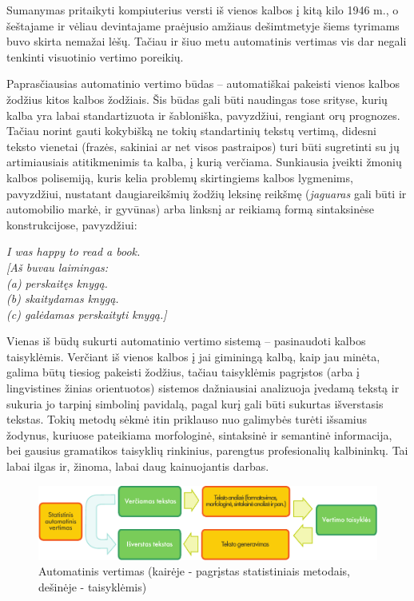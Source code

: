 \begin{multicols}{2}
 Sumanymas pritaikyti kompiuterius versti iš vienos kalbos į kitą kilo 1946 m., o šeštajame ir vėliau devintajame praėjusio amžiaus dešimtmetyje šiems tyrimams buvo skirta nemažai lėšų. Tačiau ir šiuo metu automatinis vertimas vis dar negali tenkinti visuotinio vertimo poreikių.


Paprasčiausias automatinio vertimo būdas – automatiškai pakeisti vienos kalbos žodžius kitos kalbos žodžiais. Šis būdas gali būti naudingas tose srityse, kurių kalba yra labai standartizuota ir šabloniška, pavyzdžiui, rengiant orų prognozes. Tačiau norint gauti kokybišką ne tokių standartinių tekstų vertimą, didesni teksto vienetai (frazės, sakiniai ar net visos pastraipos) turi būti sugretinti su jų artimiausiais atitikmenimis ta kalba, į kurią verčiama. Sunkiausia įveikti žmonių kalbos polisemiją, kuris kelia problemų skirtingiems kalbos lygmenims, pavyzdžiui, nustatant daugiareikšmių žodžių leksinę reikšmę (\textit{jaguaras} gali būti ir automobilio markė, ir gyvūnas) arba linksnį ar reikiamą formą sintaksinėse konstrukcijose, pavyzdžiui:

 \textit{I was happy to read a book.\\
      {[}Aš buvau laimingas:{}\\
      {}(a) perskaitęs knygą.{}\\
      {}(b) skaitydamas knygą.{}\\
      {}(c) galėdamas perskaityti knygą.{]} }     

Vienas iš būdų sukurti automatinio vertimo sistemą – pasinaudoti kalbos taisyklėmis. Verčiant iš vienos kalbos į jai giminingą kalbą, kaip jau minėta, galima būtų tiesiog pakeisti žodžius, tačiau taisyklėmis pagrįstos (arba į lingvistines žinias orientuotos) sistemos dažniausiai analizuoja įvedamą tekstą ir sukuria jo tarpinį simbolinį pavidalą, pagal kurį gali būti sukurtas išverstasis tekstas. Tokių metodų sėkmė itin priklauso nuo galimybės turėti išsamius žodynus, kuriuose pateikiama morfologinė, sintaksinė ir semantinė informacija, bei gausius gramatikos taisyklių rinkinius, parengtus profesionalių kalbininkų. Tai labai ilgas ir, žinoma, labai daug kainuojantis darbas.

\begin{figure}[htb]
  \center
  \includegraphics[width=\textwidth]{../_media/lithuanian/machine_translation}
  \caption{Automatinis vertimas (kairėje - pagrįstas statistiniais metodais, dešinėje - taisyklėmis)}  %
  \label{fig:mtarch_de}
\end{figure}


\end{multicols}
